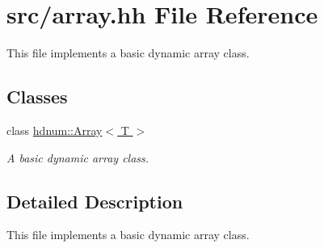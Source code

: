 \hypertarget{array_8hh}{
\section{src/array.hh File Reference}
\label{array_8hh}
}


This file implements a basic dynamic array class.  


\subsection*{Classes}
\begin{DoxyCompactItemize}
\item 
class \hyperlink{classhdnum_1_1Array}{hdnum::Array$<$ T $>$}
\begin{DoxyCompactList}\small\item\em A basic dynamic array class. \item\end{DoxyCompactList}\end{DoxyCompactItemize}


\subsection{Detailed Description}
This file implements a basic dynamic array class. 